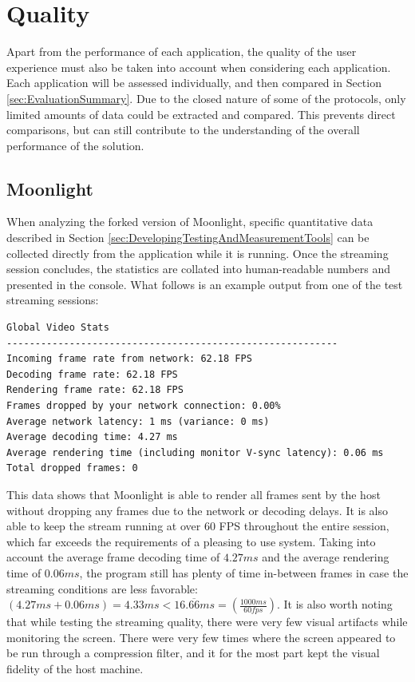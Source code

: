 \section{Quality}\label{sec:Quality}

Apart from the performance of each application, the quality of the user experience must also be taken into account when considering each application.
Each application will be assessed individually, and then compared in Section \ref{sec:EvaluationSummary}.
Due to the closed nature of some of the protocols, only limited amounts of data could be extracted and compared.
This prevents direct comparisons, but can still contribute to the understanding of the overall performance of the solution.

\subsection{Moonlight}\label{subsec:QualityMoonlight}

When analyzing the forked version of Moonlight, specific quantitative data described in Section \ref{sec:DevelopingTestingAndMeasurementTools} can be collected directly from the application while it is running.
Once the streaming session concludes, the statistics are collated into human-readable numbers and presented in the console.
What follows is an example output from one of the test streaming sessions:

\begin{lstlisting}[style=plaintext,title=Statistics generated after a streaming session]
Global Video Stats
----------------------------------------------------------
Incoming frame rate from network: 62.18 FPS
Decoding frame rate: 62.18 FPS
Rendering frame rate: 62.18 FPS
Frames dropped by your network connection: 0.00%
Average network latency: 1 ms (variance: 0 ms)
Average decoding time: 4.27 ms
Average rendering time (including monitor V-sync latency): 0.06 ms
Total dropped frames: 0
\end{lstlisting}

This data shows that Moonlight is able to render all frames sent by the host without dropping any frames due to the network or decoding delays.
It is also able to keep the stream running at over 60 FPS throughout the entire session, which far exceeds the requirements of a pleasing to use system.
Taking into account the average frame decoding time of $4.27ms$ and the average rendering time of $0.06ms$, the program still has plenty of time in-between frames in case the streaming conditions are less favorable:
$(4.27ms+0.06ms) = 4.33ms < 16.\overline{66}ms = (\frac{1000ms}{60fps})$.
It is also worth noting that while testing the streaming quality, there were very few visual artifacts while monitoring the screen.
There were very few times where the screen appeared to be run through a compression filter, and it for the most part kept the visual fidelity of the host machine.

